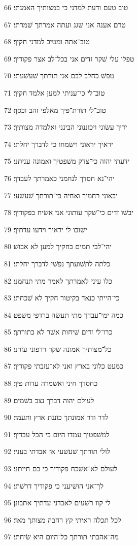 \par 66 טוב טעם ודעת למדני כי במצותיך האמנתי׃
\par 67 טרם אענה אני שׁגג ועתה אמרתך שׁמרתי׃
\par 68 טוב־אתה ומטיב למדני חקיך׃
\par 69 טפלו עלי שׁקר זדים אני בכל־לב אצר פקודיך׃
\par 70 טפשׁ כחלב לבם אני תורתך שׁעשׁעתי׃
\par 71 טוב־לי כי־עניתי למען אלמד חקיך׃
\par 72 טוב־לי תורת־פיך מאלפי זהב וכסף׃
\par 73 ידיך עשׂוני ויכוננוני הבינני ואלמדה מצותיך׃
\par 74 יראיך יראוני וישׂמחו כי לדברך יחלתי׃
\par 75 ידעתי יהוה כי־צדק משׁפטיך ואמונה עניתני׃
\par 76 יהי־נא חסדך לנחמני כאמרתך לעבדך׃
\par 77 יבאוני רחמיך ואחיה כי־תורתך שׁעשׁעי׃
\par 78 יבשׁו זדים כי־שׁקר עותוני אני אשׂיח בפקודיך׃
\par 79 ישׁובו לי יראיך וידעו עדתיך׃
\par 80 יהי־לבי תמים בחקיך למען לא אבושׁ׃
\par 81 כלתה לתשׁועתך נפשׁי לדברך יחלתי׃
\par 82 כלו עיני לאמרתך לאמר מתי תנחמני׃
\par 83 כי־הייתי כנאד בקיטור חקיך לא שׁכחתי׃
\par 84 כמה ימי־עבדך מתי תעשׂה ברדפי משׁפט׃
\par 85 כרו־לי זדים שׁיחות אשׁר לא כתורתך׃
\par 86 כל־מצותיך אמונה שׁקר רדפוני עזרני׃
\par 87 כמעט כלוני בארץ ואני לא־עזבתי פקודיך׃
\par 88 כחסדך חיני ואשׁמרה עדות פיך׃
\par 89 לעולם יהוה דברך נצב בשׁמים׃
\par 90 לדר ודר אמונתך כוננת ארץ ותעמד׃
\par 91 למשׁפטיך עמדו היום כי הכל עבדיך׃
\par 92 לולי תורתך שׁעשׁעי אז אבדתי בעניי׃
\par 93 לעולם לא־אשׁכח פקודיך כי בם חייתני׃
\par 94 לך־אני הושׁיעני כי פקודיך דרשׁתי׃
\par 95 לי קוו רשׁעים לאבדני עדתיך אתבונן׃
\par 96 לכל תכלה ראיתי קץ רחבה מצותך מאד׃
\par 97 מה־אהבתי תורתך כל־היום היא שׂיחתי׃
